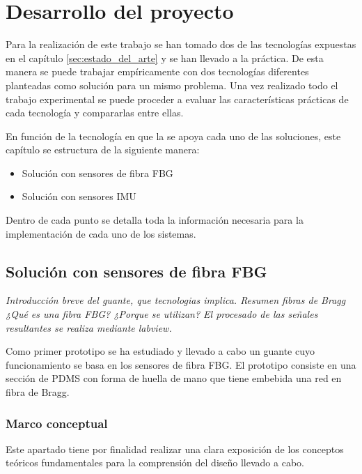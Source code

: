 \chapter{Desarrollo del proyecto\label{sec:disenho}}

Para la realización de este trabajo se han tomado dos de las tecnologías expuestas en el capítulo \ref{sec:estado_del_arte} y se han llevado a la práctica. De esta manera se puede trabajar empíricamente con dos tecnologías diferentes planteadas como solución para un mismo problema. Una vez realizado todo el trabajo experimental se puede proceder a evaluar las características prácticas de cada tecnología y compararlas entre ellas. 

En función de la tecnología en que la se apoya cada uno de las soluciones, %
este capítulo se estructura de la siguiente manera: 
\begin{itemize}
	\item {Solución con sensores de fibra FBG} 
	\item {Solución con sensores IMU}
\end{itemize}
Dentro de cada punto se detalla toda la información necesaria para la implementación de cada uno de los sistemas.  

\section{Solución con sensores de fibra FBG}
\label{sec:FBG3}
\textit{
Introducción breve del guante, que tecnologias implica.
Resumen fibras de Bragg 
¿Qué es una fibra FBG?
¿Porque se utilizan?
El procesado de las señales resultantes se realiza mediante labview.
}

 Como primer prototipo se ha estudiado y llevado a cabo un guante cuyo funcionamiento se basa en los sensores de fibra FBG. El prototipo consiste en una sección de PDMS con forma de huella de mano que tiene embebida una red en fibra de Bragg. 


\subsection{Marco conceptual}
\label{sec:mc3FBG}

Este apartado tiene por finalidad realizar una clara exposición de los conceptos teóricos fundamentales para la comprensión del diseño llevado a cabo. 

